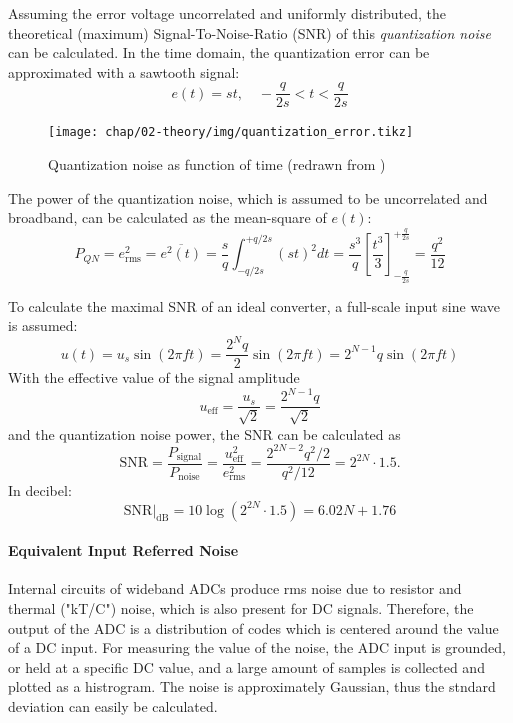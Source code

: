 Assuming the error voltage uncorrelated and uniformly distributed, the theoretical (maximum) Signal-To-Noise-Ratio (SNR) of this \textit{quantization noise} can be calculated. In the time domain, the quantization error can be approximated with a sawtooth signal:
\begin{equation}
	e(t) = st, \quad -\frac{q}{2s} < t < \frac{q}{2s} 
\end{equation}
\begin{figure}[H]
	\centering
	\texttt{[image: chap/02-theory/img/quantization\_error.tikz]}
	\caption{Quantization noise as function of time (redrawn from \cite{walt})}
	\label{fig:eq}
\end{figure}

The power of the quantization noise, which is assumed to be uncorrelated and broadband, can be calculated as the mean-square of $e(t)$:
\begin{equation}
	P_{QN} = e_{\text{rms}}^{2} = \overline{e^{2}(t)} = \frac{s}{q}\int_{-q/2s}^{+q/2s} (st)^{2} dt = \frac{s^3}{q} \left[ \frac{t^3}{3}\right]_{-\frac{q}{2s}}^{+\frac{q}{2s}} = \frac{q^2}{12}
\end{equation}

To calculate the maximal SNR of an ideal converter, a full-scale input sine wave is assumed:
\begin{equation}
	u(t) = u_s \sin(2\pi f t) = \frac{2^{N}q}{2}\sin(2\pi f t)  = 2^{N-1}q \sin(2\pi f t)
\end{equation}
With the effective value of the signal amplitude
\begin{equation}
	u_{\text{eff}} = \frac{u_s}{\sqrt{2}} = \frac{2^{N-1}q}{\sqrt{2}}
\end{equation}
and the quantization noise power, the SNR can be calculated as
\begin{equation}
	\text{SNR} = \frac{P_{\text{signal}}}{P_{\text{noise}}} = \frac{u_{\text{eff}}^{2}}{e_{\text{rms}}^{2}} = \frac{2^{2N-2}q^2/2}{q^2/12} = 2^{2N} \cdot 1.5.
\end{equation}
In decibel:
\begin{equation}
	\text{SNR}|_{\text{dB}} = 10\log\left(2^{2N}\cdot 1.5\right) = 6.02 N + 1.76
\end{equation}
\cite{puente2015} \cite{walt}

\paragraph{Equivalent Input Referred Noise}
Internal circuits of wideband ADCs produce rms noise due to resistor and thermal ("kT/C") noise, which is also present for DC signals. Therefore, the output of the ADC is a distribution of codes which is centered around the value of a DC input. For measuring the value of the noise, the ADC input is grounded, or held at a specific DC value, and a large amount of samples is collected and plotted as a histrogram. The noise is approximately Gaussian, thus the stndard deviation can easily be calculated.


